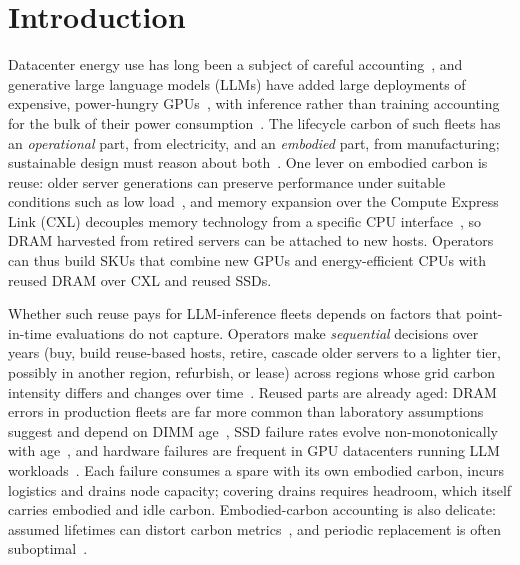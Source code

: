 \documentclass{article} %
\begin{document}
\section{Introduction}
\label{sec:intro}
Datacenter energy use has long been a subject of careful accounting~\citep{Masanet2020RecalibratingGlobal}, and generative large language models (LLMs) have added large deployments of expensive, power-hungry GPUs~\citep{Patel2023SplitwiseEfficient}, with inference rather than training accounting for the bulk of their power consumption~\citep{Niu2026TokenpowerbenchBenchmarking}. The lifecycle carbon of such fleets has an \emph{operational} part, from electricity, and an \emph{embodied} part, from manufacturing; sustainable design must reason about both~\citep{Acun2023CarbonDependencies}. One lever on embodied carbon is reuse: older server generations can preserve performance under suitable conditions such as low load~\citep{Wang2023PeelingBack}, and memory expansion over the Compute Express Link (CXL) decouples memory technology from a specific CPU interface~\citep{Sun2023DemystifyingCxl,Sharma2024IntroductionCompute}, so DRAM harvested from retired servers can be attached to new hosts. Operators can thus build SKUs that combine new GPUs and energy-efficient CPUs with reused DRAM over CXL and reused SSDs.

Whether such reuse pays for LLM-inference fleets depends on factors that point-in-time evaluations do not capture. Operators make \emph{sequential} decisions over years (buy, build reuse-based hosts, retire, cascade older servers to a lighter tier, possibly in another region, refurbish, or lease) across regions whose grid carbon intensity differs and changes over time~\citep{Wiesner2021LetsWait}. Reused parts are already aged: DRAM errors in production fleets are far more common than laboratory assumptions suggest and depend on DIMM age~\citep{Schroeder2009DramErrors,Sridharan2015MemoryErrors}, SSD failure rates evolve non-monotonically with age~\citep{Meza2015LargescaleFlash}, and hardware failures are frequent in GPU datacenters running LLM workloads~\citep{Hu2024CharacterizationLarge}. Each failure consumes a spare with its own embodied carbon, incurs logistics and drains node capacity; covering drains requires headroom, which itself carries embodied and idle carbon. Embodied-carbon accounting is also delicate: assumed lifetimes can distort carbon metrics~\citep{Huang2025CaseAccurate}, and periodic replacement is often suboptimal~\citep{Sharma2025TowardOptimal}.
\end{document}
